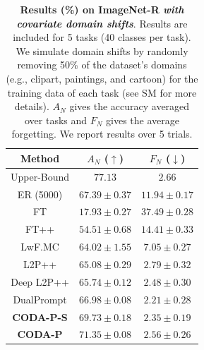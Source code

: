 \begin{table}[t]
\caption{\textbf{Results (\%) on ImageNet-R \emph{with covariate domain shifts}}. Results are included for 5 tasks (40 classes per task). We simulate domain shifts by randomly removing 50\% of the dataset's domains (e.g., clipart, paintings, and cartoon) for the training data of each task (see SM for more details). $A_N$ gives the accuracy averaged over tasks and $F_N$ gives the average forgetting. We report results over 5 trials.}

\centering
\label{tab:imnet-r_domainshift}
\begin{tabular}{c||c c} 
\hline
\rule{0pt}{10pt} Method & $A_N$ ($\uparrow$) & $F_N$ ($\downarrow$) \\
\hline
Upper-Bound   & $77.13$ & $2.66$   \\ 
\hline
ER (5000)    & $67.39 \pm 0.37$ & $11.94 \pm 0.17$  \\
FT           & $17.93 \pm 0.27$ & $37.49 \pm 0.28$ \\
FT++         & $54.51 \pm 0.68$ & $14.41 \pm 0.33$ \\
LwF.MC       & $64.02 \pm 1.55$ & $7.05 \pm 0.27$  \\
L2P++        & $65.08 \pm 0.29$ & $2.79 \pm 0.32$  \\
Deep L2P++   & $65.74 \pm 0.12$ & $2.48 \pm 0.30$   \\ 
DualPrompt   & $66.98 \pm 0.08$ & $\bm{2.21 \pm 0.28}$   \\
\hdashline
\textbf{CODA-P-S}   & $69.73 \pm 0.18$ & $2.35 \pm 0.19$  \\
\textbf{CODA-P}     & $\bm{71.35 \pm 0.08}$ & $2.56 \pm 0.26$  \\

\hline
\end{tabular}
\end{table}




